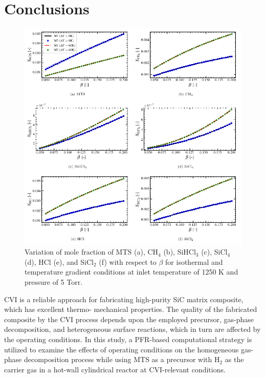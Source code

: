\documentclass[final, letterpaper, square, comma, numbers, sort&compress]{elsarticle}
\begin{document}
\section{Conclusions}
\begin{figure}[p]
    \centering\includegraphics[width=\textwidth]{ph-fig11.png}
    \caption{Variation of mole fraction of MTS (a), CH$_4$ (b), SiHCl$_3$ (c), SiCl$_4$ (d), HCl (e), and SiCl$_2$ (f) with respect to $\beta$ for isothermal and temperature gradient conditions at inlet temperature of 1250 K and pressure of 5 Torr.}
    \label{fig:11}
\end{figure}
CVI is a reliable approach for fabricating high-purity SiC matrix composite, which has excellent thermo- mechanical properties. The quality of the fabricated composite by the CVI process depends upon the employed precursor, gas-phase decomposition, and heterogeneous surface reactions, which in turn are affected by the operating conditions. In this study, a PFR-based computational strategy is utilized to examine the effects of operating conditions on the homogeneous gas-phase decomposition process while using MTS as a precursor with H$_2$ as the carrier gas in a hot-wall cylindrical reactor at CVI-relevant conditions.
\end{document}
